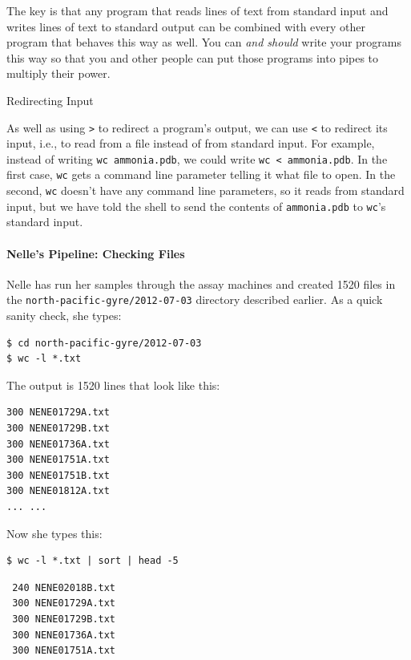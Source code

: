 \documentclass{book}
\begin{document}
The key is that any program that reads lines of text from standard input
and writes lines of text to standard output can be combined with every
other program that behaves this way as well. You can \emph{and should}
write your programs this way so that you and other people can put those
programs into pipes to multiply their power.

\begin{swcbox}{Redirecting Input}

As well as using \texttt{\textgreater{}} to redirect a program's output,
we can use \texttt{\textless{}} to redirect its input, i.e., to read
from a file instead of from standard input. For example, instead of
writing \texttt{wc ammonia.pdb}, we could write
\texttt{wc \textless{} ammonia.pdb}. In the first case, \texttt{wc} gets
a command line parameter telling it what file to open. In the second,
\texttt{wc} doesn't have any command line parameters, so it reads from
standard input, but we have told the shell to send the contents of
\texttt{ammonia.pdb} to \texttt{wc}'s standard input.

\end{swcbox}

\mbox{}\paragraph{Nelle's Pipeline: Checking Files}

Nelle has run her samples through the assay machines and created 1520
files in the \texttt{north-pacific-gyre/2012-07-03} directory described
earlier. As a quick sanity check, she types:

\begin{verbatim}
$ cd north-pacific-gyre/2012-07-03
$ wc -l *.txt
\end{verbatim}

The output is 1520 lines that look like this:

\begin{verbatim}
300 NENE01729A.txt
300 NENE01729B.txt
300 NENE01736A.txt
300 NENE01751A.txt
300 NENE01751B.txt
300 NENE01812A.txt
... ...
\end{verbatim}

Now she types this:

\begin{verbatim}
$ wc -l *.txt | sort | head -5
\end{verbatim}

\begin{verbatim}
 240 NENE02018B.txt
 300 NENE01729A.txt
 300 NENE01729B.txt
 300 NENE01736A.txt
 300 NENE01751A.txt
\end{verbatim}
\end{document}
